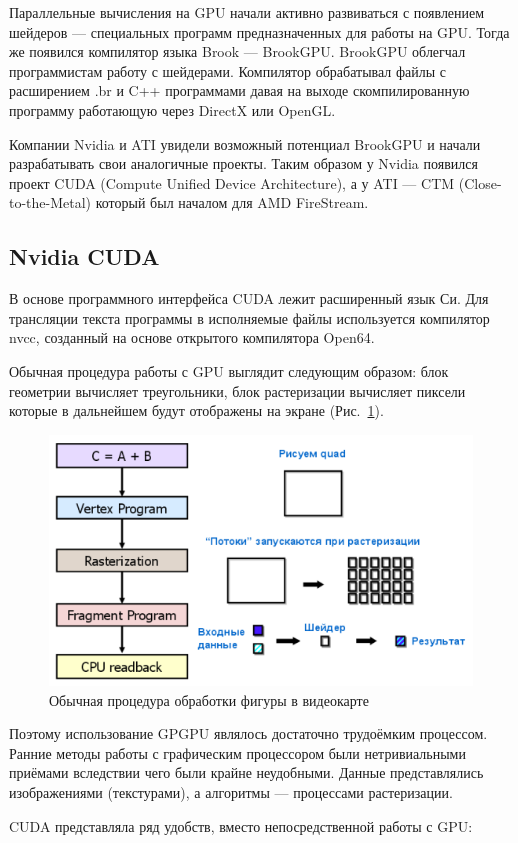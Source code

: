 Параллельные вычисления на GPU начали активно развиваться с появлением шейдеров --- специальных программ предназначенных для работы на GPU. Тогда же появился компилятор языка Brook --- BrookGPU. BrookGPU облегчал программистам работу с шейдерами. Компилятор обрабатывал файлы с расширением .br и C++ программами давая на выходе скомпилированную программу работающую через DirectX или OpenGL.

Компании Nvidia и ATI увидели возможный потенциал BrookGPU и начали разрабатывать свои аналогичные проекты. Таким образом у Nvidia появился проект CUDA (Compute Unified Device Architecture), а у ATI --- CTM (Close-to-the-Metal) который был началом для AMD FireStream.

\subsection {Nvidia CUDA}

В основе программного интерфейса CUDA лежит расширенный язык Си. Для трансляции текста программы в исполняемые файлы используется компилятор nvcc, созданный на основе открытого компилятора Open64.

Обычная процедура работы с GPU выглядит следующим образом: блок геометрии вычисляет треугольники, блок растеризации вычисляет пиксели которые в дальнейшем будут отображены на экране (Рис.~\ref{ris:process}).

\begin{figure}[ht!]
\begin{center}
\includegraphics[width=0.5\linewidth]{img/pipeline2.png}
\caption{Обычная процедура обработки фигуры в видеокарте}
\label{ris:process}
\end{center}
\end{figure}

Поэтому использование GPGPU являлось достаточно трудоёмким процессом. Ранние методы работы с графическим процессором были нетривиальными приёмами вследствии чего были крайне неудобными. Данные представлялись изображениями (текстурами), а алгоритмы --- процессами растеризации.

CUDA представляла ряд удобств, вместо непосредственной работы с GPU:

